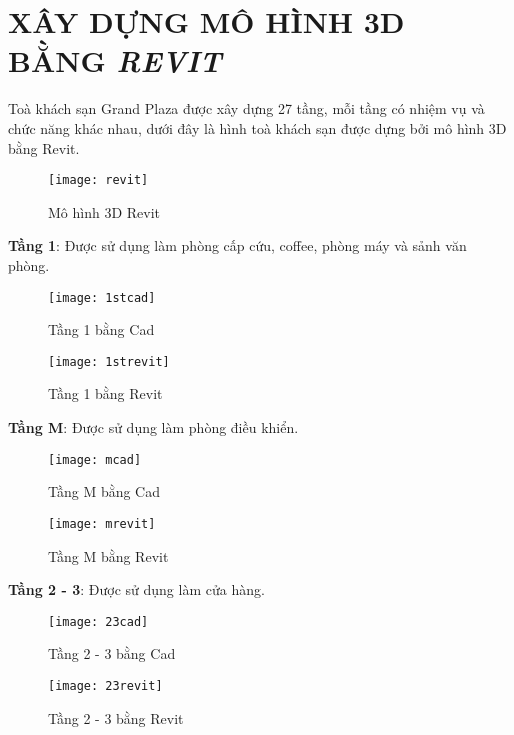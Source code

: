 
\section{XÂY DỰNG MÔ HÌNH 3D BẰNG \emph{REVIT}}
	Toà khách sạn Grand Plaza được xây dựng 27 tầng, mỗi tầng có nhiệm vụ và chức năng khác nhau, dưới đây là hình toà khách sạn được dựng bởi mô hình 3D bằng Revit.

\begin{figure}[H]
  \centering
  \texttt{[image: revit]}
  \caption{Mô hình 3D Revit}
  \label{revit}
\end{figure}

\newpage
\textbf{Tầng 1}: Được sử dụng làm phòng cấp cứu, coffee, phòng máy và sảnh văn phòng.

\begin{figure}[H]
  \centering
  \texttt{[image: 1stcad]}
  \caption{Tầng 1 bằng Cad}
  \label{1stcad}
\end{figure}

\begin{figure}[H]
  \centering
  \texttt{[image: 1strevit]}
  \caption{Tầng 1 bằng Revit}
  \label{1strevit}
\end{figure}

\newpage
\textbf{Tầng M}: Được sử dụng làm phòng điều khiển.

\begin{figure}[H]
  \centering
  \texttt{[image: mcad]}
  \caption{Tầng M bằng Cad}
  \label{mcad}
\end{figure}

\begin{figure}[H]
  \centering
  \texttt{[image: mrevit]}
  \caption{Tầng M bằng Revit}
  \label{mrevit}
\end{figure} 

\newpage
\textbf{Tầng 2 - 3}: Được sử dụng làm cửa hàng.

\begin{figure}[H]
  \centering
  \texttt{[image: 23cad]}
  \caption{Tầng 2 - 3 bằng Cad}
  \label{23cad}
\end{figure}

\begin{figure}[H]
  \centering
  \texttt{[image: 23revit]}
  \caption{Tầng 2 - 3 bằng Revit}
  \label{23revit}
\end{figure} 


